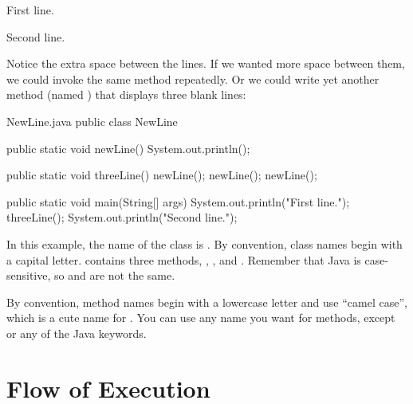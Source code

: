 \begin{stdout}
First line.

Second line.
\end{stdout}

Notice the extra space between the lines.
If we wanted more space between them, we could invoke the same method repeatedly.
Or we could write yet another method (named ) that displays three blank lines:


\begin{trinket}{NewLine.java}
public class NewLine {

    public static void newLine() {
        System.out.println();
    }

    public static void threeLine() {
        newLine();
        newLine();
        newLine();
    }

    public static void main(String[] args) {
        System.out.println("First line.");
        threeLine();
        System.out.println("Second line.");
    }
}
\end{trinket}


In this example, the name of the class is .
By convention, class names begin with a capital letter.
 contains three methods, , , and .
Remember that Java is case-sensitive, so  and  are not the same.


By convention, method names begin with a lowercase letter and use ``camel case'', which is a cute name for .
You can use any name you want for methods, except  or any of the Java keywords.



\section{Flow of Execution}

